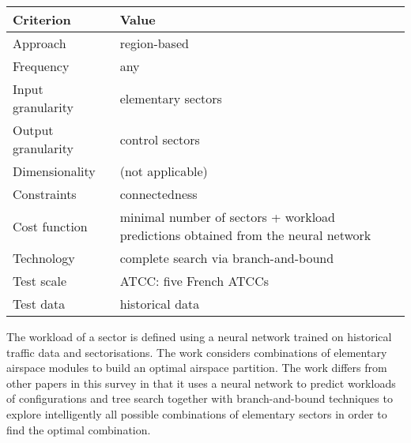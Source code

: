 \documentclass[a4paper,12pt]{article}
\begin{document}
\begin{center}
\begin{tabular}{|l|l|}
  \hline
  Criterion & Value \\
  \hline\hline
  Approach & region-based \\ \hline
  Frequency & any \\ \hline
  Input granularity & elementary sectors \\ \hline
  Output granularity & control sectors \\ \hline
  Dimensionality & (not applicable) \\ \hline
  Constraints & connectedness \\ \hline
  Cost function & \parbox{11.5cm}{minimal number of sectors + 
    workload predictions obtained from the neural network} \\ \hline
  Technology & complete search via branch-and-bound \\ \hline
  Test scale & ATCC: five French ATCCs \\ \hline
  Test data & historical data \\ \hline
\end{tabular}
\end{center}
The workload of a sector is defined using a neural network trained on
historical traffic data and sectorisations.  The work considers
combinations of elementary airspace modules to build an optimal
airspace partition.  The work differs from other papers in this survey
in that it uses a neural network to predict workloads of
configurations and tree search together with branch-and-bound
techniques to explore intelligently all possible combinations of
elementary sectors in order to find the optimal combination.

\subsection{\cite{Sabhnani:ATIO10}}
\end{document}

